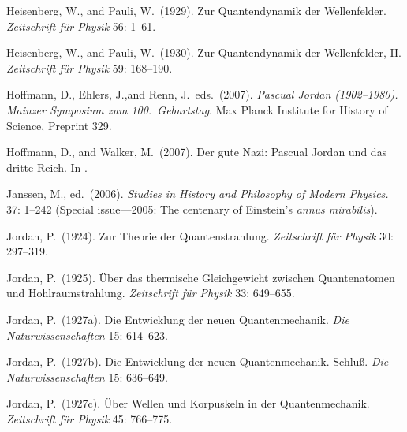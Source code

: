 \documentclass{elsart}
\begin{document}
{\begin{thebibliography}{}

 Heisenberg, W., and Pauli, W.\ (1929). Zur Quantendynamik der Wellenfelder. {\it Zeitschrift f\"{u}r Physik} 56: 1--61.

 Heisenberg, W., and Pauli, W.\  (1930). Zur Quantendynamik der Wellenfelder, II. {\it Zeitschrift f\"{u}r Physik} 59: 168--190.

  Hoffmann, D.,  Ehlers, J.,and Renn, J.\ eds.\ (2007). {\it Pascual Jordan (1902--1980). Mainzer Symposium zum 100.\ Geburtstag}. Max Planck Institute for History of Science, Preprint 329. 

 Hoffmann, D., and Walker, M.\ (2007). Der gute Nazi: Pascual Jordan und das dritte Reich. In \citep[pp.\ 83--112]{Hoffmann 2007}.


 Janssen, M., ed.\ (2006). {\it Studies in History and Philosophy of Modern Physics.} 37: 1--242 (Special issue---2005: The centenary of Einstein's {\it annus mirabilis}).

 Jordan, P.\ (1924). Zur Theorie der Quantenstrahlung. {\it Zeitschrift f\"{u}r Physik} 30: 297--319.

 Jordan, P.\  (1925). \"Uber das thermische Gleichgewicht zwischen Quantenatomen und Hohlraumstrahlung. {\it Zeitschrift f\"{u}r Physik} 33: 649--655.

 Jordan, P.\  (1927a). Die Entwicklung der neuen Quantenmechanik. {\it Die Naturwissenschaften} 15: 614--623.

 Jordan, P.\  (1927b). Die Entwicklung der neuen Quantenmechanik. Schlu\ss.  {\it Die Naturwissenschaften} 15: 636--649.

 Jordan, P.\  (1927c). \"Uber Wellen und Korpuskeln in der Quantenmechanik. {\it Zeitschrift f\"{u}r Physik} 45: 766--775.


\end{thebibliography}}
\end{document}
